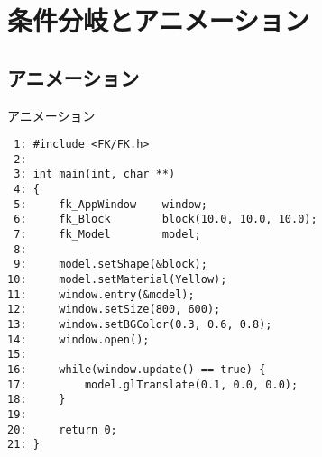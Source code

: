 ﻿\chapter{条件分岐とアニメーション}
\section{アニメーション} \label{sec:03-anim}
\begin{itembox}[l]{アニメーション}
\begin{verbatim}
 1: #include <FK/FK.h>
 2: 
 3: int main(int, char **)
 4: {
 5:     fk_AppWindow    window;
 6:     fk_Block        block(10.0, 10.0, 10.0);
 7:     fk_Model        model;
 8: 
 9:     model.setShape(&block);
10:     model.setMaterial(Yellow);
11:     window.entry(&model);
12:     window.setSize(800, 600);
13:     window.setBGColor(0.3, 0.6, 0.8);
14:     window.open();
15: 
16:     while(window.update() == true) {
17:         model.glTranslate(0.1, 0.0, 0.0);
18:     }
19: 
20:     return 0;
21: }
\end{verbatim}
\end{itembox}
